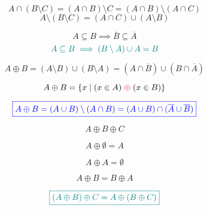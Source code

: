 \begin{frame}{}
  \begin{theorem}
    \[
      A \cap (B \setminus C) = (A \cap B) \setminus C
                             = (A \cap B) \setminus (A \cap C)
    \]
    \[
      A \setminus (B \setminus C) = (A \cap C) \cup (A \setminus B)
    \]
  \end{theorem}
\end{frame}

\begin{frame}{}
  \begin{theorem}
    \[
      A \subseteq B \implies \overline{B} \subseteq \overline{A}
    \]
    \[
      \textcolor{teal}{A \subseteq B \implies (B \setminus A) \cup A = B}
    \]
  \end{theorem}
\end{frame}

\begin{frame}{}
  \begin{definition}
    \[
      A \oplus B = (A \setminus B) \cup (B \setminus A)
        = (A \cap \overline{B}) \cup (B \cap \overline{A})
    \]
  \end{definition}

  \[
    A \oplus B = \{x \mid (x \in A) \;\textcolor{red}{\oplus}\; (x \in B)\}
  \]

  \pause

  \pause
  \[
    \textcolor{blue}{\boxed{A \oplus B = (A \cup B) \setminus (A \cap B)
      = (A \cup B) \cap (\overline{A} \cup \overline{B})}}
  \]
\end{frame}

\begin{frame}{}
  \[
    A \oplus B \oplus C
  \]

\end{frame}

\begin{frame}{}
  \[
    A \oplus \emptyset = A
  \]

  \pause
  \[
    A \oplus A = \emptyset
  \]

  \[
    A \oplus B = B \oplus A
  \]

  \[
    \textcolor{teal}{\boxed{(A \oplus B) \oplus C = A \oplus (B \oplus C)}}
  \]
\end{frame}

